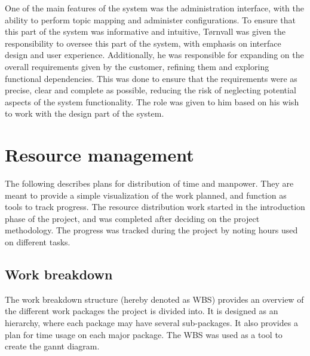 One of the main features of the system was the administration interface, with the ability to perform topic mapping and administer configurations. To ensure that this part of the system was informative and intuitive, Tørnvall was given the responsibility to oversee this part of the system, with emphasis on interface design and user experience. Additionally, he was responsible for expanding on the overall requirements given by the customer, refining them and exploring functional dependencies. This was done to ensure that the requirements were as precise, clear and complete as possible, reducing the risk of neglecting potential aspects of the system functionality. The role was given to him based on his wish to work with the design part of the system.

\clearpage

\section{Resource management}
\label{sec:process_and_methodology-resource_management}

The following describes plans for distribution of time and manpower. They are meant to provide a simple visualization of the work planned, and function as tools to track progress. The resource distribution work started in the introduction phase of the project, and was completed after deciding on the project methodology. The progress was tracked during the project by noting hours used on different tasks.

\subsection{Work breakdown}
\label{subsec:process_and_methodology-resource_management-work_breakdown}

The work breakdown structure (hereby denoted as WBS) provides an overview of the different work packages the project is divided into. It is designed as an hierarchy, where each package may have several sub-packages. It also provides a plan for time usage on each major package. The WBS was used as a tool to create the gannt diagram.


